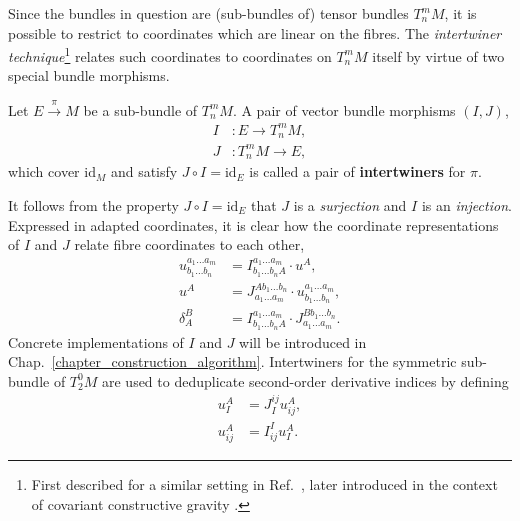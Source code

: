 Since the bundles in question are (sub-bundles of) tensor bundles $T^m_nM$, it is possible to restrict to coordinates which are linear on the fibres. The \emph{intertwiner technique}\footnote{First described for a similar setting in Ref.\ \cite{Reiss_2014}, later introduced in the context of covariant constructive gravity \cite{Alex_2020}.} relates such coordinates to coordinates on $T^m_nM$ itself by virtue of two special bundle morphisms.
\begin{definition}[intertwiners]\label{def_intertwiner}
  Let $E\overset{\pi}{\longrightarrow}M$ be a sub-bundle of $T^m_nM$. A pair of vector bundle morphisms $(I,J)$,
  \begin{equation}
    \begin{aligned}
      I&{} \colon E\rightarrow T^m_nM, \\
      J&{} \colon T^m_nM\rightarrow E,
    \end{aligned}
  \end{equation}
  which cover $\mathrm{id}_M$ and satisfy $J\circ I = \mathrm{id}_E$ is called a pair of \textbf{intertwiners} for $\pi$.
\end{definition}
It follows from the property $J\circ I=\mathrm{id}_E$ that $J$ is a \emph{surjection} and $I$ is an \emph{injection}. Expressed in adapted coordinates, it is clear how the coordinate representations of $I$ and $J$ relate fibre coordinates to each other,
\begin{equation}
  \begin{aligned}
  u^{a_1\dots a_m}_{b_1\dots b_n} &= I^{a_1\dots a_m}_{b_1\dots b_nA} \cdot u^A, \\
  u^A &= J^{Ab_1\dots b_n}_{a_1\dots a_m} \cdot u^{a_1\dots a_m}_{b_1\dots b_n}, \\
  \delta^B_A &{} = I^{a_1\dots a_m}_{b_1\dots b_nA} \cdot J^{Bb_1\dots b_n}_{a_1\dots a_m}.
  \end{aligned}
\end{equation}
Concrete implementations of $I$ and $J$ will be introduced in Chap.\ \ref{chapter_construction_algorithm}. Intertwiners for the symmetric sub-bundle of $T^0_2M$ are used to deduplicate second-order derivative indices by defining
\begin{equation}
  \begin{aligned}
    u^A_{I} &{} = J^{ij}_I u^A_{ij}, \\
    u^A_{ij} &{} = I^I_{ij} u^A_I.
  \end{aligned}
\end{equation}


